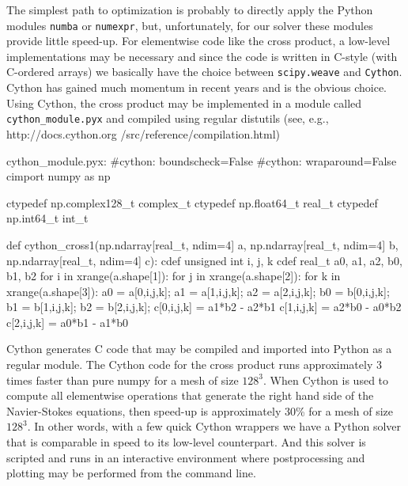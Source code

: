 \documentclass[11pt, oneside]{article}
\newcommand{\inpyth}{\lstinline[style=pythonstyle, basicstyle=\ttfamily]} %[]%
\begin{document}
The simplest path to optimization is probably to directly apply the Python modules \inpyth{numba} or \inpyth{numexpr}, but, unfortunately, for our solver these modules provide little speed-up. For elementwise code like the cross product, a low-level implementations may be necessary and since the code is written in C-style (with C-ordered arrays) we basically have the choice between \inpyth{scipy.weave} and \inpyth{Cython}. Cython has gained much momentum in recent years and is the obvious choice. Using Cython, the cross product may be implemented in a module called \inpyth{cython_module.pyx} and compiled using regular distutils (see, e.g., http://docs.cython.org /src/reference/compilation.html)
\begin{python}
cython_module.pyx:
#cython: boundscheck=False
#cython: wraparound=False
cimport numpy as np

ctypedef np.complex128_t complex_t
ctypedef np.float64_t real_t
ctypedef np.int64_t int_t

def cython_cross1(np.ndarray[real_t, ndim=4] a,
                  np.ndarray[real_t, ndim=4] b,
                  np.ndarray[real_t, ndim=4] c):
    cdef unsigned int i, j, k
    cdef real_t a0, a1, a2, b0, b1, b2
    for i in xrange(a.shape[1]):
        for j in xrange(a.shape[2]):
            for k in xrange(a.shape[3]):
                a0 = a[0,i,j,k];
                a1 = a[1,i,j,k];
                a2 = a[2,i,j,k];
                b0 = b[0,i,j,k];
                b1 = b[1,i,j,k];
                b2 = b[2,i,j,k];
                c[0,i,j,k] = a1*b2 - a2*b1
                c[1,i,j,k] = a2*b0 - a0*b2
                c[2,i,j,k] = a0*b1 - a1*b0

\end{python}
Cython generates C code that may be compiled and imported into Python as a regular module. The Cython code for the cross product runs approximately 3 times faster than pure numpy for a mesh of size $128^3$. When Cython is used to compute all elementwise operations that generate the right hand side of the Navier-Stokes equations, then speed-up is approximately 30\% for a mesh of size $128^3$. In other words, with a few quick Cython wrappers we have a Python solver that is comparable in speed to its low-level counterpart. And this solver is scripted and runs in an interactive environment where postprocessing and plotting may be performed from the command line.
\end{document}
